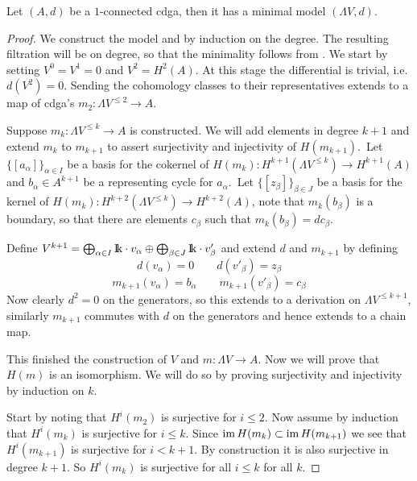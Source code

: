 \begin{theorem}
	Let $(A, d)$ be a $1$-connected cdga, then it has a minimal model $(\Lambda V, d)$.
\end{theorem}
\begin{proof}
	We construct the model and by induction on the degree. The resulting filtration will be on degree, so that the minimality follows from . We start by setting $V^0 = V^1 = 0$ and $V^2 = H^2(A)$. At this stage the differential is trivial, i.e. $d(V^2) = 0$. Sending the cohomology classes to their representatives extends to a map of cdga's $m_2 : \Lambda V^{\leq 2} \to A$.

	Suppose $m_k : \Lambda V^{\leq k} \to A$ is constructed. We will add elements in degree $k+1$ and extend $m_k$ to $m_{k+1}$ to assert surjectivity and injectivity of $H(m_{k+1})$.\, Let $\{ [a_\alpha] \}_{\alpha \in I}$ be a basis for the cokernel of $H(m_k) : H^{k+1}(\Lambda V^{\leq k}) \to H^{k+1}(A)$ and $b_\alpha \in A^{k+1}$ be a representing cycle for $a_\alpha$.\, Let $\{ [z_\beta] \}_{\beta \in J}$ be a basis for the kernel of $H(m_k) : H^{k+2}(\Lambda V^{\leq k}) \to H^{k+2}(A)$, note that $m_k(b_\beta)$ is a boundary, so that there are elements $c_\beta$ such that $m_k(b_\beta) = d c_\beta$.

	Define $V^{k+1} = \bigoplus_{\alpha \in I} \mathrm{I\!k} \cdot v_\alpha \oplus \bigoplus_{\beta \in J} \mathrm{I\!k} \cdot v'_\beta$ and extend $d$ and $m_{k+1}$ by defining
	\[ d(v_\alpha) = 0 \qquad d(v'_\beta) = z_\beta \]
	\[ m_{k+1}(v_\alpha) = b_\alpha \qquad m_{k+1}(v'_\beta) = c_\beta \]
	Now clearly $d^2=0$ on the generators, so this extends to a derivation on $\Lambda V^{\leq k+1}$, similarly $m_{k+1}$ commutes with $d$ on the generators and hence extends to a chain map.

	This finished the construction of $V$ and $m : \Lambda V \to A$. Now we will prove that $H(m)$ is an isomorphism. We will do so by proving surjectivity and injectivity by induction on $k$.

	Start by noting that $H^i(m_2)$ is surjective for $i \leq 2$. Now assume by induction that $H^i(m_k)$ is surjective for $i \leq k$. Since $\operatorname*{im} H(m_k) \subset \operatorname*{im} H(m_{k+1})$ we see that $H^i(m_{k+1})$ is surjective for $i < k+1$. By construction it is also surjective in degree $k+1$. So $H^i(m_k)$ is surjective for all $i \leq k$ for all $k$.


\end{proof}
